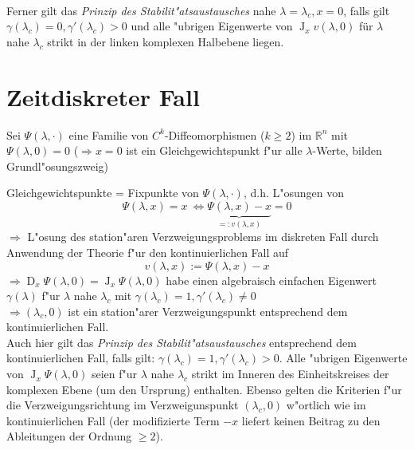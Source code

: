 \documentclass[a4paper, 13pt]{scrreprt}
\theoremstyle{definition} \newtheorem{definition}{Definition}[section]
\begin{document}
\\

Ferner gilt das \emph{Prinzip des Stabilit"atsaustausches} nahe $\lambda = \lambda_c, x=0$, falls gilt $\gamma(\lambda_c)=0, \gamma'(\lambda_c)>0$ und alle "ubrigen Eigenwerte von $\operatorname{J}_x v(\lambda,0)$ für $\lambda$ nahe $\lambda_c$ strikt in der linken komplexen Halbebene liegen.



\section{Zeitdiskreter Fall}

Sei $\Psi(\lambda,\cdot)$ eine Familie von $C^k$-Diffeomorphismen ($k\geq 2$) im $\mathbb{R}^n$ mit $\Psi(\lambda,0)=0$ ($\Rightarrow x=0$ ist ein Gleichgewichtspunkt f"ur alle $\lambda$-Werte, bilden Grundl"osungszweig)

Gleichgewichtspunkte = Fixpunkte von $\Psi(\lambda,\cdot)$, d.h. L"osungen von 
\[\Psi(\lambda,x)=x \ \Leftrightarrow \underbrace{\Psi(\lambda,x)-x}_{=:v(\lambda,x)}=0\]
$\Rightarrow $ L"osung des station"aren Verzweigungsproblems im diskreten Fall durch Anwendung der Theorie f"ur den kontinuierlichen Fall auf 
\[v(\lambda,x):=\Psi(\lambda,x)-x\]
$\Rightarrow \operatorname{D}_x \Psi(\lambda,0)=\operatorname{J}_x \Psi(\lambda,0)$ habe einen algebraisch einfachen Eigenwert $\gamma(\lambda)$ f"ur $\lambda$ nahe $\lambda_c$ mit $\gamma(\lambda_c)=1, \gamma'(\lambda_c)\neq 0$\\
$\Rightarrow (\lambda_c,0)$ ist ein station"arer Verzweigungspunkt entsprechend dem kontinuierlichen Fall.\\
Auch hier gilt das \emph{Prinzip des Stabilit"atsaustausches} entsprechend dem kontinuierlichen Fall, falls gilt: $\gamma(\lambda_c)=1, \gamma'(\lambda_c)>0$. Alle "ubrigen Eigenwerte von $\operatorname{J}_x \Psi(\lambda,0)$ seien f"ur $\lambda$ nahe $\lambda_c$ strikt im Inneren des Einheitskreises der komplexen Ebene (um den Ursprung) enthalten.
Ebenso gelten die Kriterien f"ur die Verzweigungsrichtung im Verzweigunspunkt $(\lambda_c,0)$ w"ortlich wie im kontinuierlichen Fall (der modifizierte Term $-x$ liefert keinen Beitrag zu den Ableitungen der Ordnung $\geq 2$).
\end{document}
